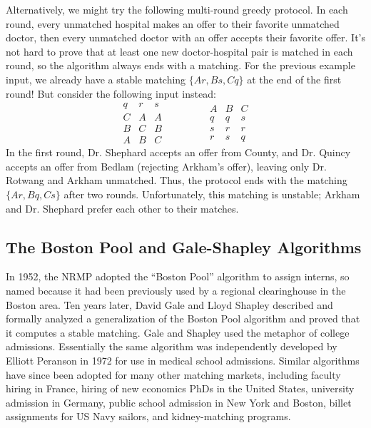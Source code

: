 Alternatively, we might try the following multi-round greedy protocol.
In each round, every unmatched hospital makes an offer to their favorite unmatched doctor, then every unmatched doctor with an offer accepts their favorite offer.
It’s not hard to prove that at least one new doctor-hospital pair is matched in each round, so the algorithm always ends with a matching.
For the previous example input, we already have a stable matching $\{Ar, Bs, Cq\}$ at the end of the first round!
But consider the following input instead:
\[
\begin{array}{ccc}
q & r & s\\
\hline
C & A & A\\
B & C & B\\
A & B & C
\end{array}
\qquad\qquad
\begin{array}{ccc}
A & B & C\\
\hline
q & q & s\\
s & r & r\\
r & s & q
\end{array}
\]
In the first round, Dr. Shephard accepts an offer from County, and Dr. Quincy accepts an offer from Bedlam (rejecting Arkham’s offer), leaving only Dr. Rotwang and Arkham unmatched.
Thus, the protocol ends with the matching $\{Ar, Bq, Cs\}$ after two rounds.
Unfortunately, this matching is unstable; Arkham and Dr. Shephard prefer each other to their matches.

\subsection{The Boston Pool and Gale-Shapley Algorithms}

In 1952, the NRMP adopted the “Boston Pool” algorithm to assign interns, so named because it had been previously used by a regional clearinghouse in the Boston area.
Ten years later, David Gale and Lloyd Shapley described and formally analyzed a generalization of the Boston Pool algorithm and proved that it computes a stable matching.
Gale and Shapley used the metaphor of college admissions.
Essentially the same algorithm was independently developed by Elliott Peranson in 1972 for use in medical school admissions.
Similar algorithms have since been adopted for many other matching markets, including faculty hiring in France, hiring of new economics PhDs in the United States, university admission in Germany, public school admission in New York and Boston, billet assignments for US Navy sailors, and kidney-matching programs.

